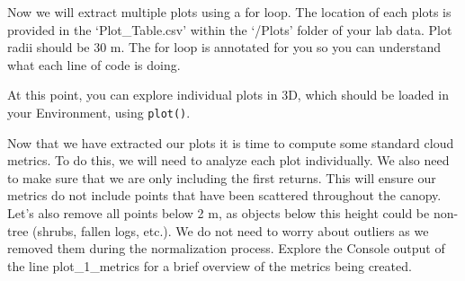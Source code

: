 \documentclass[
]{book}
\newenvironment{Shaded}{\begin{snugshade}}{\end{snugshade}}
\newcommand{\AttributeTok}[1]{\textcolor[rgb]{0.13,0.29,0.53}{#1}}
\newcommand{\CommentTok}[1]{\textcolor[rgb]{0.56,0.35,0.01}{\textit{#1}}}
\newcommand{\ControlFlowTok}[1]{\textcolor[rgb]{0.13,0.29,0.53}{\textbf{#1}}}
\newcommand{\DecValTok}[1]{\textcolor[rgb]{0.00,0.00,0.81}{#1}}
\newcommand{\FunctionTok}[1]{\textcolor[rgb]{0.13,0.29,0.53}{\textbf{#1}}}
\newcommand{\NormalTok}[1]{#1}
\newcommand{\OtherTok}[1]{\textcolor[rgb]{0.56,0.35,0.01}{#1}}
\newcommand{\SpecialCharTok}[1]{\textcolor[rgb]{0.81,0.36,0.00}{\textbf{#1}}}
\newcommand{\StringTok}[1]{\textcolor[rgb]{0.31,0.60,0.02}{#1}}
\begin{document}
Now we will extract multiple plots using a for loop. The location of each plots is provided in the `Plot\_Table.csv' within the `/Plots' folder of your lab data. Plot radii should be 30 m. The for loop is annotated for you so you can understand what each line of code is doing.

\begin{Shaded}
\end{Shaded}

At this point, you can explore individual plots in 3D, which should be loaded in your Environment, using \texttt{plot()}.

Now that we have extracted our plots it is time to compute some standard cloud metrics. To do this, we will need to analyze each plot individually. We also need to make sure that we are only including the first returns. This will ensure our metrics do not include points that have been scattered throughout the canopy. Let's also remove all points below 2 m, as objects below this height could be non-tree (shrubs, fallen logs, etc.). We do not need to worry about outliers as we removed them during the normalization process. Explore the Console output of the line plot\_1\_metrics for a brief overview of the metrics being created.
\end{document}
